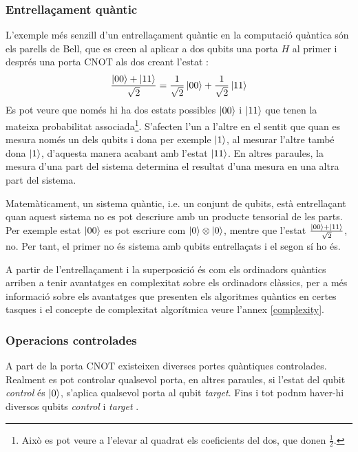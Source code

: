 \subsubsection{Entrellaçament quàntic}
L'exemple més senzill d'un entrellaçament quàntic en la computació quàntica són els parells de Bell, que es creen al aplicar a dos qubits una porta $H$ al primer i després una porta $\mathrm{CNOT}$ als dos creant l'estat \cite{QCandQI:entangle}:
$$
\frac{\ket{00}+\ket{11}}{\sqrt{2}} = \frac{1}{\sqrt{2}}\ket{00} + \frac{1}{\sqrt{2}}\ket{11}
$$
Es pot veure que només hi ha dos estats possibles $\ket{00}$ i $\ket{11}$ que tenen la mateixa probabilitat associada\footnote{Això es pot veure a l'elevar al quadrat els coeficients del dos, que donen $\frac{1}{2}$.}. S'afecten l'un a l'altre en el sentit que quan es mesura només un dels qubits i dona per exemple $\ket{1}$, al mesurar l'altre també dona $\ket{1}$, d'aquesta manera acabant amb l'estat $\ket{11}$. En altres paraules, la mesura d'una part del sistema determina el resultat d'una mesura en una altra part del sistema.

Matemàticament, un sistema quàntic, i.e. un conjunt de qubits, està entrellaçant quan aquest sistema no es pot descriure amb un producte tensorial de les parts. Per exemple estat $\ket{00}$ es pot escriure com $\ket{0}\otimes\ket{0}$, mentre que l'estat $\frac{\ket{00} + \ket{11}}{\sqrt{2}}$, no. Per tant, el primer no és sistema amb qubits entrellaçats i el segon sí ho és.

A partir de l'entrellaçament i la superposició és com els ordinadors quàntics arriben a tenir avantatges en complexitat sobre els ordinadors clàssics, per a més informació sobre els avantatges que presenten els algoritmes quàntics en certes tasques i el concepte de complexitat algorítmica veure l'annex \ref{complexity}.

\subsubsection{Operacions controlades}
A part de la porta $\mathrm{CNOT}$ existeixen diverses portes quàntiques controlades. Realment es pot controlar qualsevol porta, en altres paraules, si l'estat del qubit \textit{control} és $\ket{0}$, s'aplica qualsevol porta al qubit \textit{target}. Fins i tot podnm haver-hi diversos qubits \textit{control} i \textit{target} \cite{QCandQI:controlled}.


